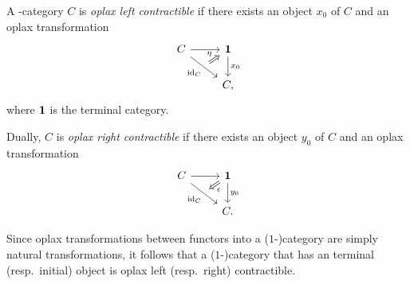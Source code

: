 \documentclass{amsart}
\newcommand{\id}{\mathrm{id}}
\begin{document}
  \begin{definition}
    A \oo\nbd-category $C$ is \emph{oplax left contractible} if
    there exists an object $x_0$ of $C$ and an oplax transformation
    \[
      \begin{tikzcd}
        C \ar[r] \ar[dr,""{name=toto},"\id_{C}"'] & \Term
        \ar[d," x_0"] \\
        & C,
        \ar[from=toto,to=1-2,Rightarrow,"\eta"]
      \end{tikzcd}
    \]
    where $\mathbf{1}$ is the terminal category.%

    Dually, $C$ is \emph{oplax right contractible} if there exists an
    object $y_0$ of $C$ and an oplax transformation
          \[
      \begin{tikzcd}
        C \ar[r] \ar[dr,""{name=toto},"\id_{C}"'] & \Term
        \ar[d," y_0"] \\
        & C.
        \ar[from=1-2,to=toto,Rightarrow,"\epsilon"]
      \end{tikzcd}
    \]
  \end{definition}
  \begin{example}
    Since oplax transformations between functors into a
    ($1$\nbd-)category are simply natural transformations, it follows
    that a ($1$\nbd-)category that has an terminal (resp.\ initial) object is oplax
    left (resp.\ right) contractible.
  \end{example}
\end{document}
